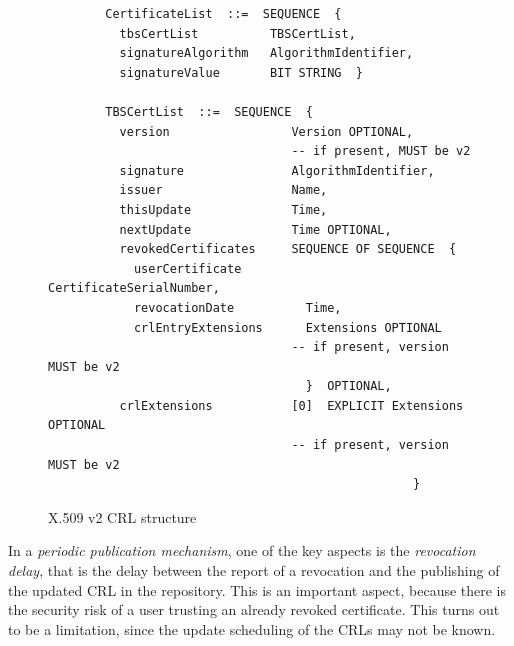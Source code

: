 \begin{figure}[h!]
  \centering
	\begin{Verbatim}
		CertificateList  ::=  SEQUENCE  {
		  tbsCertList          TBSCertList,
		  signatureAlgorithm   AlgorithmIdentifier,
		  signatureValue       BIT STRING  }

		TBSCertList  ::=  SEQUENCE  {
		  version                 Version OPTIONAL,
		                          -- if present, MUST be v2
		  signature               AlgorithmIdentifier,
		  issuer                  Name,
		  thisUpdate              Time,
		  nextUpdate              Time OPTIONAL,
		  revokedCertificates     SEQUENCE OF SEQUENCE  {
		    userCertificate         CertificateSerialNumber,
		    revocationDate          Time,
		    crlEntryExtensions      Extensions OPTIONAL
		                          -- if present, version MUST be v2
		                            }  OPTIONAL,
		  crlExtensions           [0]  EXPLICIT Extensions OPTIONAL
		                          -- if present, version MUST be v2
                                                   }
	\end{Verbatim}
  \caption{X.509 v2 CRL structure}
\label{fig:x509-crl}
\end{figure}

In a \textit{periodic publication mechanism}, one of the key aspects is the
\textit{revocation delay}, that is the delay between the report of a revocation and the publishing of the updated \ac{CRL} in the repository.
This is an important  aspect, because there is the security risk of a user trusting an already revoked certificate.
This turns out to be a limitation, since the update scheduling of the \acp{CRL} may not be known.

